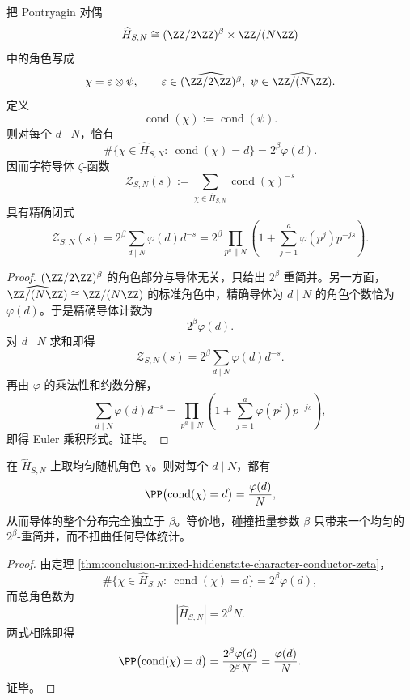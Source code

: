 \begin{theorem}\label{thm:conclusion-mixed-hiddenstate-character-conductor-zeta}
把 Pontryagin 对偶
\[
\widehat H_{S,N}\cong (\ZZ/2\ZZ)^\beta\times \ZZ/(N\ZZ)
\]
中的角色写成
\[
\chi=\varepsilon\otimes\psi,
\qquad
\varepsilon\in \widehat{(\ZZ/2\ZZ)^\beta},\ \psi\in \widehat{\ZZ/(N\ZZ)}.
\]
定义
\[
\operatorname{cond}(\chi):=\operatorname{cond}(\psi).
\]
则对每个 \(d\mid N\)，恰有
\[
\#\{\chi\in \widehat H_{S,N}:\ \operatorname{cond}(\chi)=d\}=2^\beta\varphi(d).
\]
因而字符导体 \(\zeta\)-函数
\[
\mathcal Z_{S,N}(s):=\sum_{\chi\in \widehat H_{S,N}}\operatorname{cond}(\chi)^{-s}
\]
具有精确闭式
\[
\mathcal Z_{S,N}(s)=2^\beta\sum_{d\mid N}\varphi(d)d^{-s}
=
2^\beta\prod_{p^a\parallel N}
\left(
1+\sum_{j=1}^{a}\varphi(p^j)p^{-js}
\right).
\]
\end{theorem}
\begin{proof}
\((\ZZ/2\ZZ)^\beta\) 的角色部分与导体无关，只给出 \(2^\beta\) 重简并。另一方面，\(\widehat{\ZZ/(N\ZZ)}\cong \ZZ/(N\ZZ)\) 的标准角色中，精确导体为 \(d\mid N\) 的角色个数恰为 \(\varphi(d)\)。于是精确导体计数为
\[
2^\beta\varphi(d).
\]
对 \(d\mid N\) 求和即得
\[
\mathcal Z_{S,N}(s)=2^\beta\sum_{d\mid N}\varphi(d)d^{-s}.
\]
再由 \(\varphi\) 的乘法性和约数分解，
\[
\sum_{d\mid N}\varphi(d)d^{-s}
=
\prod_{p^a\parallel N}
\left(
1+\sum_{j=1}^{a}\varphi(p^j)p^{-js}
\right),
\]
即得 Euler 乘积形式。证毕。
\end{proof}

\begin{corollary}\label{cor:conclusion-mixed-hiddenstate-random-character-conductor-law-beta-independence}
在 \(\widehat H_{S,N}\) 上取均匀随机角色 \(\chi\)。则对每个 \(d\mid N\)，都有
\[
\PP\bigl(\operatorname{cond}(\chi)=d\bigr)=\frac{\varphi(d)}{N},
\]
从而导体的整个分布完全独立于 \(\beta\)。等价地，碰撞扭量参数 \(\beta\) 只带来一个均匀的 \(2^\beta\)-重简并，而不扭曲任何导体统计。
\end{corollary}
\begin{proof}
由定理 \ref{thm:conclusion-mixed-hiddenstate-character-conductor-zeta}，
\[
\#\{\chi\in \widehat H_{S,N}:\ \operatorname{cond}(\chi)=d\}=2^\beta\varphi(d),
\]
而总角色数为
\[
|\widehat H_{S,N}|=2^\beta N.
\]
两式相除即得
\[
\PP\bigl(\operatorname{cond}(\chi)=d\bigr)
=
\frac{2^\beta\varphi(d)}{2^\beta N}
=
\frac{\varphi(d)}{N}.
\]
证毕。
\end{proof}

